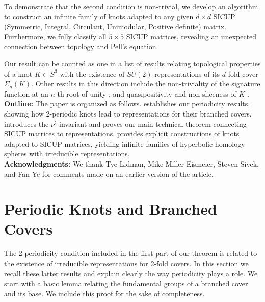 \documentclass[11pt]{amsart}
\begin{document}
To demonstrate that the second condition is non-trivial, we develop an algorithm to construct an infinite family of knots adapted to any given $d\times d$ SICUP (Symmetric, Integral, Circulant, Unimodular, Positive definite) matrix. Furthermore, we fully classify all $5\times 5$ SICUP matrices, revealing an unexpected connection between topology and Pell's equation.

Our result can be counted as one in a list of results relating topological properties of a knot $K\subset S^3$ with the existence of $SU(2)$-representations of its $d$-fold cover $\Sigma_d(K)$. Other results in this direction include the non-triviality of the signature function at an $n$-th root of unity \cite{collin}, and quasipositivity and non-sliceness of $K$ \cite{bs-stein}.\\

\textbf{Outline:} The paper is organized as follows.  establishes our periodicity results, showing how 2-periodic knots lead to representations for their branched covers.  introduces the $\nu^\sharp$ invariant and proves our main technical theorem connecting SICUP matrices to representations.  provides explicit constructions of knots adapted to SICUP matrices, yielding infinite families of hyperbolic homology spheres with irreducible representations. \\

\textbf{Acknowledgments:}  We thank Tye Lidman, Mike Miller Eismeier, Steven Sivek, and Fan Ye for comments made on an earlier version of the article. 





\section{Periodic Knots and Branched Covers}\label{periodic}
The 2-periodicity condition included in the first part of our theorem is related to the existence of irreducible representations for 2-fold covers. In this section we recall these latter results and explain clearly the way periodicity plays a role. We start with a basic lemma relating the fundamental groups of a branched cover and its base. We include this proof for the sake of completeness. 
\end{document}
